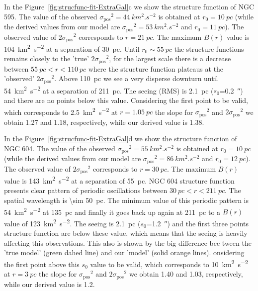 \documentclass[fleqn,usenatbib, useAMS, a4paper]{mnras}
\newcommand\pos{\ensuremath{_{\mathrm{pos}}}}
\begin{document}
In the Figure~\ref{fig:strucfunc-fit-ExtraGal}c we show the structure function of NGC 595.
The value of the observed \(\sigma\pos^2 = \SI{44}{km^{2}.s^{-2}}\) is obtained at \(r_0 = \SI{10}{pc} \) (while the derived values from our model are \(\sigma\pos^2 = \SI{53}{km^{2}.s^{-2}}\) and \(r_0 = \SI{11}{pc} \)).
The observed value of \(2\sigma\pos^2\) corresponds to \(r = \SI{21}{pc} \).
The maximum \(B(r)\) value is \SI{104}{km^{2}.s^{-2}} at a separation of \SI{30}{pc}. 
Until \(r_0 \sim \SI{55}{pc} \) the structure functions remains closely to the 'true' \(2\sigma\pos^2\), for the largest scale there is a decrease between  \(\SI{55}{pc} < r < \SI{110}{pc} \) where the structure function plateaus at the 'observed' \(2\sigma\pos^2\). 
Above \SI{110}{pc} we see a very disperse downturn  until \SI{54}{km^{2}.s^{-2}} at a separation of \SI{211}{pc}.
The seeing (RMS) is \SI{2.1}{pc} (\(s_0\)=\SI{0.2}{\arcsecond}) and there are no points below this value.
Considering the first point to be valid, which corresponds to \SI{2.5}{km^{2}.s^{-2}} at \(r = \SI{1.05}{pc} \) the slope for \(\sigma\pos^2\) and \(2\sigma\pos^2\) we obtain \num{1.27} and \num{1.18}, respectively, while our derived value is \num{1.38}.

In the Figure~\ref{fig:strucfunc-fit-ExtraGal}d we show the structure function of NGC 604.
The value of the observed \(\sigma\pos^2 = \SI{55}{km^{2}.s^{-2}}\) is obtained at \(r_0 = \SI{10}{pc} \) (while the derived values from our model are \(\sigma\pos^2 = \SI{86}{km^{2}.s^{-2}}\) and \(r_0 = \SI{12}{pc} \)).
The observed value of \(2\sigma\pos^2\) corresponds to \(r = \SI{30}{pc} \).
The maximum \(B(r)\) value is \SI{143}{km^{2}.s^{-2}} at a separation of \SI{55}{pc}. 
NGC 604 structure function presents clear pattern of periodic oscillations between  \(\SI{30}{pc} < r < \SI{211}{pc} \).
The spatial wavelength is \SI{ \sim 50}{pc}. 
The minimum value of this periodic pattern is \SI{54}{km^{2}.s^{-2}} at \SI{135}{pc} 
and finally it goes back up again at \SI{211}{pc} to a \(B(r)\) value of \SI{123}{km^{2}.s^{-2}}.
The seeing is \SI{2.1}{pc} (\(s_0\)=\SI{1.2}{\arcsecond}) and the first three points structure function are below these value, which means that the seeing is heavily affecting this observations.
This also is shown by the big difference bee tween the 'true model' (green dahed line) and our 'model' (solid orange lines).
onsidering the first point above this \(s_0\) value to be valid, which corresponds to \SI{10}{km^{2}.s^{-2}} at \(r = \SI{3}{pc} \) the slope for \(\sigma\pos^2\) and \(2\sigma\pos^2\) we obtain \num{1.40} and \num{1.03}, respectively, while our derived value is \num{1.2}.
\end{document}
